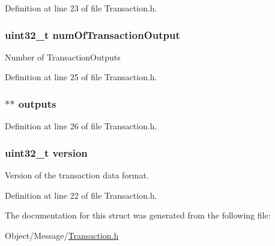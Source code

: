 Definition at line 23 of file Transaction.h.

\hypertarget{struct_m_i_transaction_aa6fd5ebfb79f09bf74e1b0f63f557348}{
\subsubsection[{numOfTransactionOutput}]{\setlength{\rightskip}{0pt plus 5cm}uint32\_\-t {\bf numOfTransactionOutput}}}
\label{struct_m_i_transaction_aa6fd5ebfb79f09bf74e1b0f63f557348}
Number of TransactionOutputs 

Definition at line 25 of file Transaction.h.

\hypertarget{struct_m_i_transaction_af782b989431a6d6831659788e15004f9}{
\subsubsection[{outputs}]{$\ast$$\ast$ {\bf outputs}}}
\label{struct_m_i_transaction_af782b989431a6d6831659788e15004f9}


Definition at line 26 of file Transaction.h.

\hypertarget{struct_m_i_transaction_acd99bb05ca015e7d74448acb1deba7ca}{
\subsubsection[{version}]{\setlength{\rightskip}{0pt plus 5cm}uint32\_\-t {\bf version}}}
\label{struct_m_i_transaction_acd99bb05ca015e7d74448acb1deba7ca}
Version of the transaction data format. 

Definition at line 22 of file Transaction.h.



The documentation for this struct was generated from the following file:\begin{DoxyCompactItemize}
\item 
Object/Message/\hyperlink{_m_i_transaction_8h}{Transaction.h}\end{DoxyCompactItemize}
